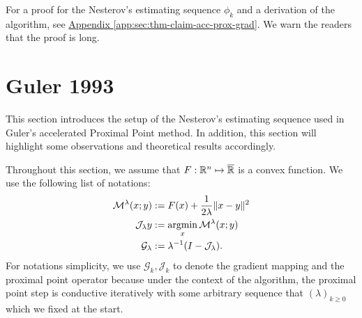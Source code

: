 \documentclass[12pt]{article}
\begin{document}
    For a proof for the Nesterov's estimating sequence $\phi_k$ and a derivation of the algorithm, see
    \hyperref[app:sec:thm-claim-acc-prox-grad]{Appendix \ref*{app:sec:thm-claim-acc-prox-grad}}. 
    We warn the readers that the proof is long. 

\section{Guler 1993}
    This section introduces the setup of the Nesterov's estimating sequence used in Guler's accelerated Proximal Point method. 
    In addition, this section will highlight some observations and theoretical results accordingly. 
    
    Throughout this section, we assume that $F:\mathbb R^n \mapsto \overline {\mathbb R}$ is a convex function. 
    We use the following list of notations: 
    \begin{align*}
        \mathcal M^{\lambda} (x; y) &:= F(x) + \frac{1}{2\lambda}\Vert x - y\Vert^2
        \\
        \mathcal J_\lambda y &:= \mathop{\rm argmin}\limits_x \mathcal M^{\lambda} (x; y)
        \\
        \mathcal G_\lambda &:= \lambda^{-1}(I - \mathcal J_\lambda). 
    \end{align*}
    For notations simplicity, we use $\mathcal G_k, \mathcal J_k$ to denote the gradient mapping and the proximal point operator because under the context of the algorithm, the proximal point step is conductive iteratively with some arbitrary sequence that $(\lambda)_{k \ge 0}$ which we fixed at the start. 
    
\end{document}
